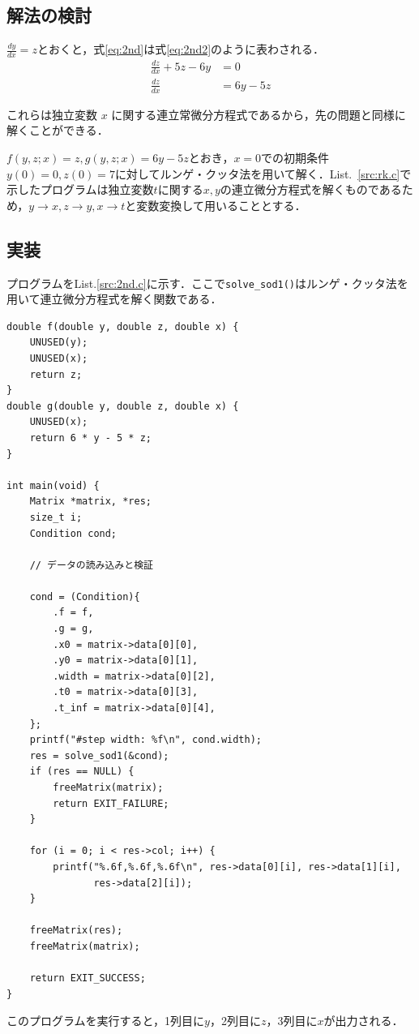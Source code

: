 \documentclass[gutter=20mm,fore-edge=20mm,head_space=30mm,foot_space=30mm]{jlreq}
\begin{document}
\subsection{解法の検討}
$\displaystyle \frac{dy}{dx} = z$とおくと，式\ref{eq:2nd}は式\ref{eq:2nd2}のように表わされる．
\begin{align}
  \frac{dz}{dx} + 5z - 6y & = 0 \nonumber             \\
  \frac{dz}{dx}           & = 6y - 5z \label{eq:2nd2}
\end{align}

これらは独立変数 $x$ に関する連立常微分方程式であるから，先の問題と同様に解くことができる．

$f(y, z; x) = z, g(y, z; x) = 6y - 5z$とおき，$x = 0$での初期条件$\displaystyle y(0) = 0, z(0) = 7$に対してルンゲ・クッタ法を用いて解く．List.~\ref{src:rk.c}で示したプログラムは独立変数$t$に関する$x, y$の連立微分方程式を解くものであるため，$y \rightarrow x, z \rightarrow y, x \rightarrow t$と変数変換して用いることとする．

\subsection{実装}

プログラムをList.\ref{src:2nd.c}に示す．ここで\verb|solve_sod1()|はルンゲ・クッタ法を用いて連立微分方程式を解く関数である．
\begin{lstlisting}[caption=2nd.c,label=src:2nd.c]
double f(double y, double z, double x) {
    UNUSED(y);
    UNUSED(x);
    return z;
}
double g(double y, double z, double x) {
    UNUSED(x);
    return 6 * y - 5 * z;
}

int main(void) {
    Matrix *matrix, *res;
    size_t i;
    Condition cond;

    // データの読み込みと検証

    cond = (Condition){
        .f = f,
        .g = g,
        .x0 = matrix->data[0][0],
        .y0 = matrix->data[0][1],
        .width = matrix->data[0][2],
        .t0 = matrix->data[0][3],
        .t_inf = matrix->data[0][4],
    };
    printf("#step width: %f\n", cond.width);
    res = solve_sod1(&cond);
    if (res == NULL) {
        freeMatrix(matrix);
        return EXIT_FAILURE;
    }

    for (i = 0; i < res->col; i++) {
        printf("%.6f,%.6f,%.6f\n", res->data[0][i], res->data[1][i],
               res->data[2][i]);
    }

    freeMatrix(res);
    freeMatrix(matrix);

    return EXIT_SUCCESS;
}
\end{lstlisting}
このプログラムを実行すると，1列目に$y$，2列目に$z$，3列目に$x$が出力される．
\end{document}

